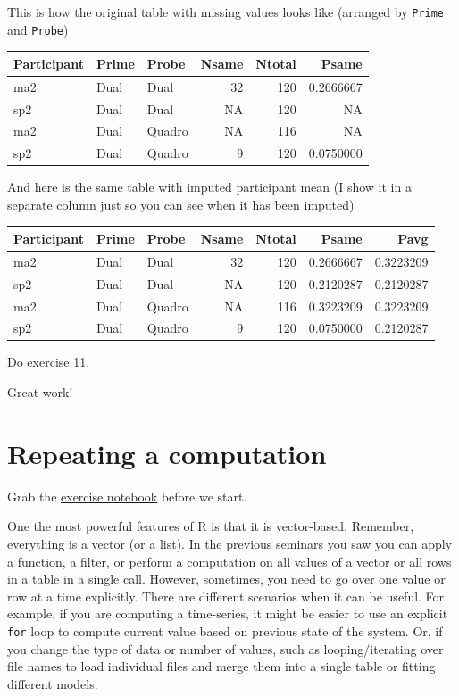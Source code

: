 \documentclass[
]{book}
\begin{document}
This is how the original table with missing values looks like (arranged by \texttt{Prime} and \texttt{Probe})

\begin{tabular}{l|l|l|r|r|r}
\hline
Participant & Prime & Probe & Nsame & Ntotal & Psame\\
\hline
ma2 & Dual & Dual & 32 & 120 & 0.2666667\\
\hline
sp2 & Dual & Dual & NA & 120 & NA\\
\hline
ma2 & Dual & Quadro & NA & 116 & NA\\
\hline
sp2 & Dual & Quadro & 9 & 120 & 0.0750000\\
\hline
\end{tabular}

And here is the same table with imputed participant mean (I show it in a separate column just so you can see when it has been imputed)

\begin{tabular}{l|l|l|r|r|r|r}
\hline
Participant & Prime & Probe & Nsame & Ntotal & Psame & Pavg\\
\hline
ma2 & Dual & Dual & 32 & 120 & 0.2666667 & 0.3223209\\
\hline
sp2 & Dual & Dual & NA & 120 & 0.2120287 & 0.2120287\\
\hline
ma2 & Dual & Quadro & NA & 116 & 0.3223209 & 0.3223209\\
\hline
sp2 & Dual & Quadro & 9 & 120 & 0.0750000 & 0.2120287\\
\hline
\end{tabular}

Do exercise 11.

Great work!

\hypertarget{seminar11}{%
\chapter{Repeating a computation}\label{seminar11}}

Grab the \href{notebooks/Seminar\%2010\%20-\%20repetition.Rmd}{exercise notebook} before we start.

One the most powerful features of R is that it is vector-based. Remember, everything is a vector (or a list). In the previous seminars you saw you can apply a function, a filter, or perform a computation on all values of a vector or all rows in a table in a single call. However, sometimes, you need to go over one value or row at a time explicitly. There are different scenarios when it can be useful. For example, if you are computing a time-series, it might be easier to use an explicit \texttt{for} loop to compute current value based on previous state of the system. Or, if you change the type of data or number of values, such as looping/iterating over file names to load individual files and merge them into a single table or fitting different models.
\end{document}
